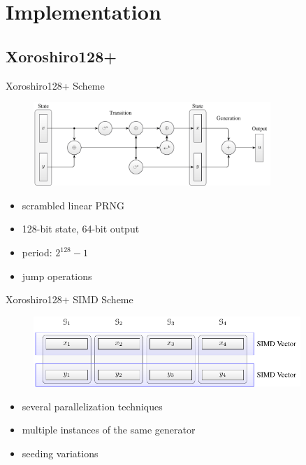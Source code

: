 \documentclass[aspectratio=169]{beamer}
\begin{document}
  \section{Implementation} %
  \label{sec:implementation}
    \subsection{Xoroshiro128+}
    \begin{frame}{Xoroshiro128+ Scheme}
      \begin{figure}
        \includegraphics[width=0.8\textwidth]{figures/xrsr128p_scheme.pdf}
      \end{figure}
      \bigskip
      \begin{minipage}{0.5\textwidth}
        \begin{itemize}
          \item scrambled linear PRNG
          \item 128-bit state, 64-bit output
        \end{itemize}
      \end{minipage}
      \hfill
      \begin{minipage}{0.49\textwidth}
        \begin{itemize}
          \item period: $2^{128}-1$
          \item jump operations
        \end{itemize}
      \end{minipage}
    \end{frame}

    \begin{frame}{Xoroshiro128+ SIMD Scheme}
      \begin{figure}
        \includegraphics[width=0.9\textwidth]{figures/xrsr128p_vector_layout.pdf}
      \end{figure}
      \begin{itemize}
        \item several parallelization techniques
        \item multiple instances of the same generator
        \item seeding variations
      \end{itemize}
    \end{frame}
\end{document}
